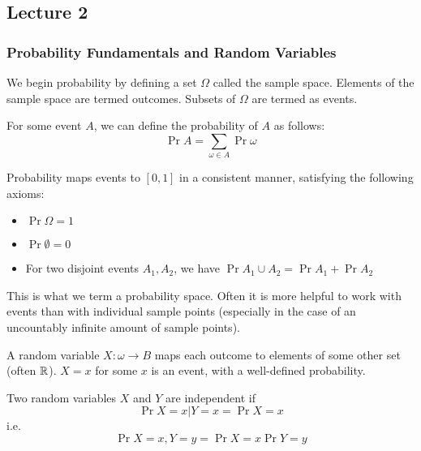 \subsection{Lecture 2}

\subsubsection{Probability Fundamentals and Random Variables}

We begin probability by defining a set $\Omega$ called the sample space.
Elements of the sample space are termed outcomes. Subsets of $\Omega$ are termed as events.

For some event $A$, we can define the probability of $A$ as follows:
\[ \Pr{A} = \sum_{\omega \in A} \Pr{\omega} \]

Probability maps events to $[0, 1]$ in a consistent manner, satisfying the following axioms:
\begin{itemize}
    \item $\Pr{\Omega} = 1$
    \item $\Pr{\emptyset} = 0$
    \item For two disjoint events $A_1, A_2$, we have $\Pr{A_1 \cup A_2} = \Pr{A_1} + \Pr{A_2}$
\end{itemize}
This is what we term a probability space. Often it is more helpful to work with events than
with individual sample points (especially in the case of an uncountably infinite amount of sample points).

\begin{definition} 
    A random variable $X: \omega \to B$ maps each outcome to elements of some other set (often $\operatorname{\mathbb{R}}$).
    $X = x$ for some $x$ is an event, with a well-defined probability.
\end{definition}


\begin{definition} [Independence]
    Two random variables $X$ and $Y$ are independent if
    \[\Pr{X = x | Y = x} = \Pr{X = x} \]
    i.e.
    \[\Pr{X = x, Y = y} = \Pr{X = x} \Pr{Y = y} \]
\end{definition}

